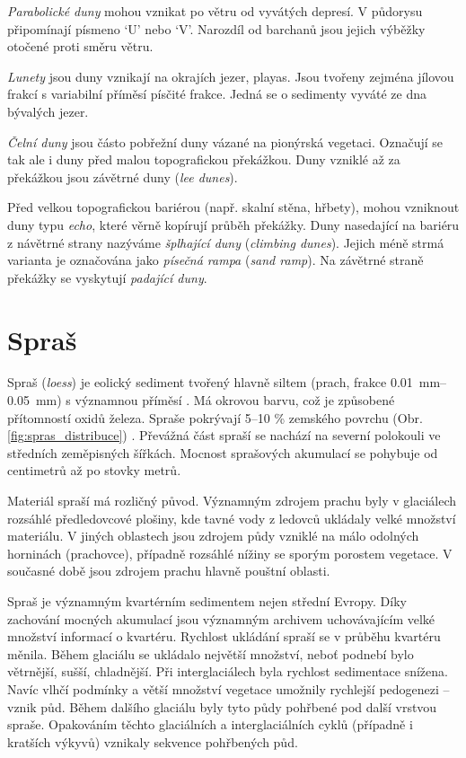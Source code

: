 \emph{Parabolické duny} mohou vznikat po větru od vyvátých depresí. V půdorysu připomínají písmeno \enquote*{U} nebo \enquote*{V}. Narozdíl od barchanů jsou jejich výběžky otočené proti směru větru.

\emph{Lunety} jsou duny vznikají na okrajích jezer, playas. Jsou tvořeny zejména jílovou frakcí s variabilní příměsí písčité frakce. Jedná se o sedimenty vyváté ze dna bývalých jezer.

\emph{Čelní duny} jsou částo pobřežní duny vázané na pionýrská vegetaci. Označují se tak ale i duny před malou topografickou překážkou. Duny vzniklé až za překážkou jsou závětrné duny (\textit{lee dunes}).

Před velkou topografickou bariérou (např. skalní stěna, hřbety),  mohou vzniknout duny typu \emph{echo}, které věrně kopírují průběh překážky. Duny nasedající na bariéru z návětrné strany nazýváme \emph{šplhající duny} (\textit{climbing dunes}). Jejich méně strmá varianta je označována jako \emph{písečná rampa} (\textit{sand ramp}). Na závětrné straně překážky se vyskytují \emph{padající duny}.

\section{Spraš}
Spraš (\textit{loess}) je eolický sediment tvořený hlavně siltem (prach, frakce \SIrange{0,01}{0,05}{\milli\metre}) s významnou příměsí . Má okrovou barvu, což je způsobené přítomností oxidů železa. Spraše pokrývají 5--10 \% zemského povrchu (Obr. \ref{fig:spras_distribuce}) \textcite{biermanKeyConceptsGeomorphology2014}. Převážná část spraší se nachází na severní polokouli ve středních zeměpisných šířkách. Mocnost sprašových akumulací se pohybuje od centimetrů až po stovky metrů. 

Materiál spraší má rozličný původ. Významným zdrojem prachu byly v glaciálech rozsáhlé předledovcové plošiny, kde tavné vody z ledovců ukládaly velké množství materiálu. V jiných oblastech jsou zdrojem půdy vzniklé na málo odolných horninách (prachovce), případně rozsáhlé nížiny se sporým porostem vegetace. V současné době jsou zdrojem prachu hlavně pouštní oblasti.

Spraš je významným kvartérním sedimentem nejen střední Evropy. Díky zachování mocných akumulací jsou významným archivem uchovávajícím velké množství informací o kvartéru. Rychlost ukládání spraší se v průběhu kvartéru měnila. Během glaciálu se ukládalo největší množství, neboť podnebí bylo větrnější, sušší, chladnější. Při interglaciálech byla rychlost sedimentace snížena. Navíc vlhčí podmínky a větší množství vegetace umožnily rychlejší pedogenezi -- vznik půd. Během dalšího glaciálu byly tyto půdy pohřbené pod další vrstvou spraše. Opakováním těchto glaciálních a interglaciálních cyklů (případně i kratších výkyvů) vznikaly sekvence pohřbených půd. 

